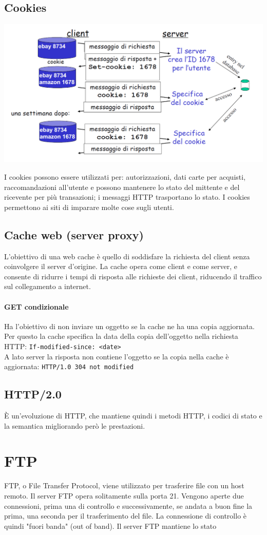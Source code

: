 \documentclass{report}
\begin{document}
	\subsection{Cookies}
	\begin{center}
		\includegraphics[width=0.7\linewidth]{cookies.png}
	\end{center}
	I cookies possono essere utilizzati per: autorizzazioni, dati carte per acquisti, raccomandazioni all'utente e possono mantenere lo stato del mittente e del ricevente per più transazioni; i messaggi HTTP trasportano lo stato. I cookies permettono ai siti di imparare molte cose sugli utenti.
	\subsection{Cache web (server proxy)}
	L'obiettivo di una web cache è quello di soddisfare la richiesta del client senza coinvolgere il server d'origine. La cache opera come client e come server, e consente di ridurre i tempi di risposta alle richieste dei client, riducendo il traffico sul collegamento a internet.
	\paragraph{GET condizionale} Ha l'obiettivo di non inviare un oggetto se la cache ne ha una copia aggiornata. 
	\\Per questo la cache specifica la data della copia dell'oggetto nella richiesta HTTP: \verb|If-modified-since: <date>|
	\\A lato server la risposta non contiene l'oggetto se la copia nella cache è aggiornata: \verb|HTTP/1.0 304 not modified|
	\subsection{HTTP/2.0}
	È un’evoluzione di HTTP, che mantiene quindi i metodi HTTP, i codici di stato e la semantica migliorando però le prestazioni.
	\section{FTP}
	FTP, o File Transfer Protocol, viene utilizzato per trasferire file con un host remoto. Il server FTP opera solitamente sulla porta 21. Vengono aperte due connessioni, prima una di controllo e successivamente, se andata a buon fine la prima, una seconda per il trasferimento del file. La connessione di controllo è quindi "fuori banda" (out of band). Il server FTP mantiene lo stato
\end{document}
